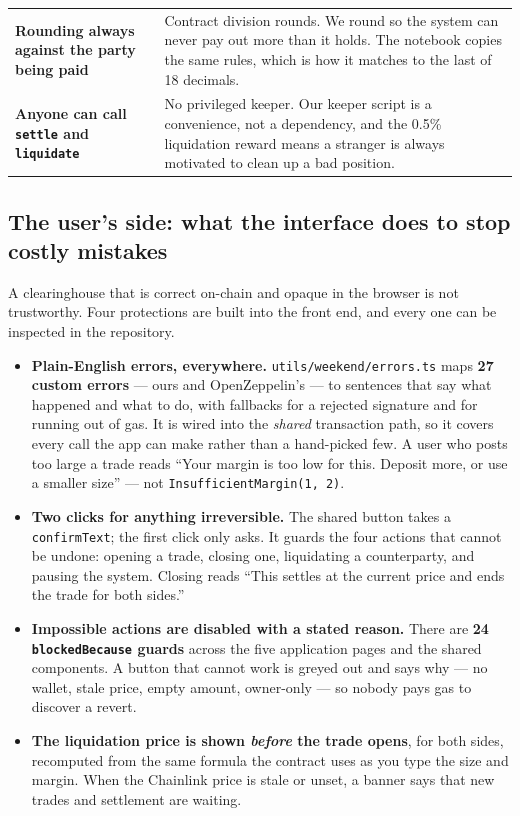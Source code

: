 \documentclass[11pt,a4paper]{article}
\begin{document}
\begin{center}
\begin{tabular}{@{}p{3.6cm}p{11.8cm}@{}}
\textbf{Rounding always against the party being paid} &
Contract division rounds. We round so the system can never pay out more than it holds. The notebook
copies the same rules, which is how it matches to the last of 18 decimals. \\

\textbf{Anyone can call \texttt{settle} and \texttt{liquidate}} &
No privileged keeper. Our keeper script is a convenience, not a dependency, and the 0.5\% liquidation
reward means a stranger is always motivated to clean up a bad position. \\
\bottomrule
\end{tabular}
\end{center}

\subsection{The user's side: what the interface does to stop costly mistakes}\label{sec:ux}

A clearinghouse that is correct on-chain and opaque in the browser is not trustworthy. Four
protections are built into the front end, and every one can be inspected in the repository.

\begin{itemize}
  \item \textbf{Plain-English errors, everywhere.} \texttt{utils/weekend/errors.ts} maps
  \textbf{27 custom errors} — ours and OpenZeppelin's — to sentences that say what happened and what
  to do, with fallbacks for a rejected signature and for running out of gas. It is wired into the
  \emph{shared} transaction path, so it covers every call the app can make rather than a hand-picked
  few. A user who posts too large a trade reads ``Your margin is too low for this. Deposit more, or
  use a smaller size'' — not \texttt{InsufficientMargin(1, 2)}.
  \item \textbf{Two clicks for anything irreversible.} The shared button takes a
  \texttt{confirmText}; the first click only asks. It guards the four actions that cannot be undone:
  opening a trade, closing one, liquidating a counterparty, and pausing the system. Closing reads
  ``This settles at the current price and ends the trade for both sides.''
  \item \textbf{Impossible actions are disabled with a stated reason.} There are \textbf{24
  \texttt{blockedBecause} guards} across the five application pages and the shared components. A
  button that cannot work is greyed out and says why — no wallet, stale price, empty amount,
  owner-only — so nobody pays gas to discover a revert.
  \item \textbf{The liquidation price is shown \emph{before} the trade opens}, for both sides,
  recomputed from the same formula the contract uses as you type the size and margin. When the
  Chainlink price is stale or unset, a banner says that new trades and settlement are waiting.
\end{itemize}
\end{document}
